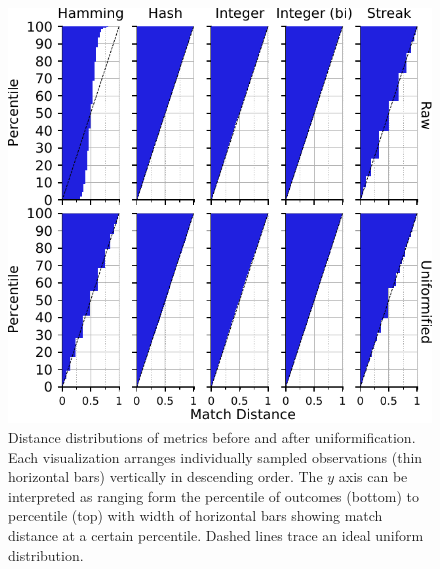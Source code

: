 \begin{figure}
\begin{center}

\includegraphics[width=\columnwidth]{img/uniformification/bitweight=0dot5+seed=1+title=low-score-distribution+_data_hathash_hash=75684cf1e73fb7f1+_script_fullcat_hash=c3113c80efb02374+ext=}
\caption{
Distance distributions of metrics before and after uniformification.
Each visualization arranges individually sampled observations (thin horizontal bars) vertically in descending order.
The $y$ axis can be interpreted as ranging form the  percentile of outcomes (bottom) to  percentile (top) with width of horizontal bars showing match distance at a certain percentile.
Dashed lines trace an ideal uniform distribution.
}
\label{fig:uniformification}

\end{center}
\end{figure}
